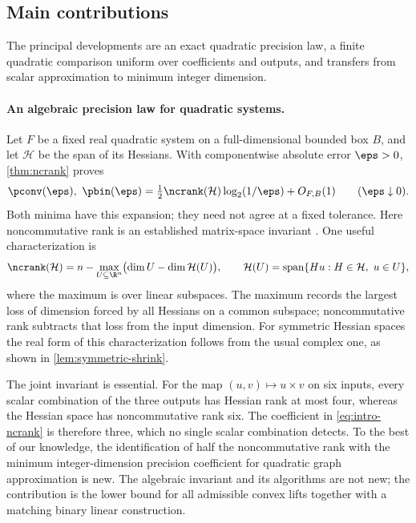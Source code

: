 \subsection{Main contributions}

The principal developments are an exact quadratic precision law, a finite
quadratic comparison uniform over coefficients and outputs, and transfers
from scalar approximation to minimum integer dimension.

\paragraph{An algebraic precision law for quadratic systems.}
Let $F$ be a fixed real quadratic system on a full-dimensional bounded
box $B$, and let $\mathcal H$ be the span of its Hessians. With componentwise
absolute error $\eps>0$, \cref{thm:ncrank} proves
\begin{equation}\label{eq:intro-ncrank}
 \pconv(\eps),\ \pbin(\eps)
 =\tfrac12\ncrank(\mathcal H)\log_2(1/\eps)+O_{F,B}(1)
 \qquad(\eps\downarrow0).
\end{equation}
Both minima have this expansion; they need not agree at a fixed tolerance.
Here noncommutative rank is an established matrix-space invariant
\citep{ggow2020,iqs2018}. One useful characterization is
\[
 \ncrank(\mathcal H)
 =n-\max_{U\subseteq\R^n}
       \bigl(\dim U-\dim\mathcal H(U)\bigr),
 \qquad
 \mathcal H(U)=\operatorname{span}\{Hu:H\in\mathcal H,\ u\in U\},
\]
where the maximum is over linear subspaces. The maximum records the largest loss
of dimension forced by all Hessians on a common subspace; noncommutative
rank subtracts that loss from the input dimension. For symmetric
Hessian spaces the real form of this characterization follows from the
usual complex one, as shown in \cref{lem:symmetric-shrink}.

The joint invariant is essential. For the map $(u,v)\mapsto u\times v$
on six inputs, every scalar combination of the three outputs has Hessian
rank at most four, whereas the Hessian space has noncommutative rank six.
The coefficient in \eqref{eq:intro-ncrank} is therefore three, which no
single scalar combination detects. To the best of our knowledge, the
identification of half the noncommutative rank with the minimum
integer-dimension precision coefficient for quadratic graph approximation
is new. The algebraic invariant and its algorithms are not new; the
contribution is the lower bound for all admissible convex lifts together
with a matching binary linear construction.

